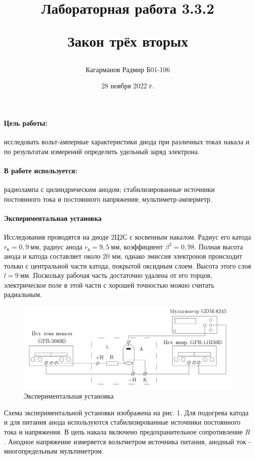 \documentclass[a4paper,12pt]{article}
\title{Лабораторная работа 3.3.2

Закон трёх вторых}
\author{Кагарманов Радмир Б01-106}
\date{28 ноября 2022 г.}
\begin{document}
\maketitle
\thispagestyle{empty}
\newpage
\setcounter{page}{1}

\paragraph{Цель работы:} исследовать вольт-амперные характеристики диода при различных токах накала и по результатам измерений определить удельный заряд электрона.

\paragraph{В работе используется:} радиолампа с цилиндрическим анодом; стабилизированные источники постоянного тока и постоянного напряжения; мультиметр-амперметр. 

\paragraph{Экспериментальная установка\\}
Исследования проводятся на диоде 2Ц2С с косвенным накалом. Радиус его катода $r_{к} = 0,9 ~мм$, радиус анода $r_{а} = 9,5 ~мм$, коэффициент $\beta^2 = 0,98$. Полная высота анода и катода составляет около 20 мм, однако эмиссия электронов происходит только с центральной части катода, покрытой оксидным слоем. Высота этого слоя $l = 9~мм$. Поскольку рабочая часть достаточно удалена от его торцов, электрическое поле в этой части с хорошей точностью можно считать радиальным. \par

\begin{figure}[!h]
\centering
\includegraphics[width=0.9\linewidth]{экспериментальная установка.png}
\caption{Экспериментальная установка}
\label{fig:mpr}
\end{figure}

Схема экспериментальной установки изображена на рис. 1. Для подогрева катода и для питания анода используются стабилизированные источники постоянного тока и напряжения. В цепь накала включено предохранительное сопротивление $R$. Анодное напряжение измеряется вольтметром источника питания, анодный ток - многопредельным мультиметром.
\end{document}
